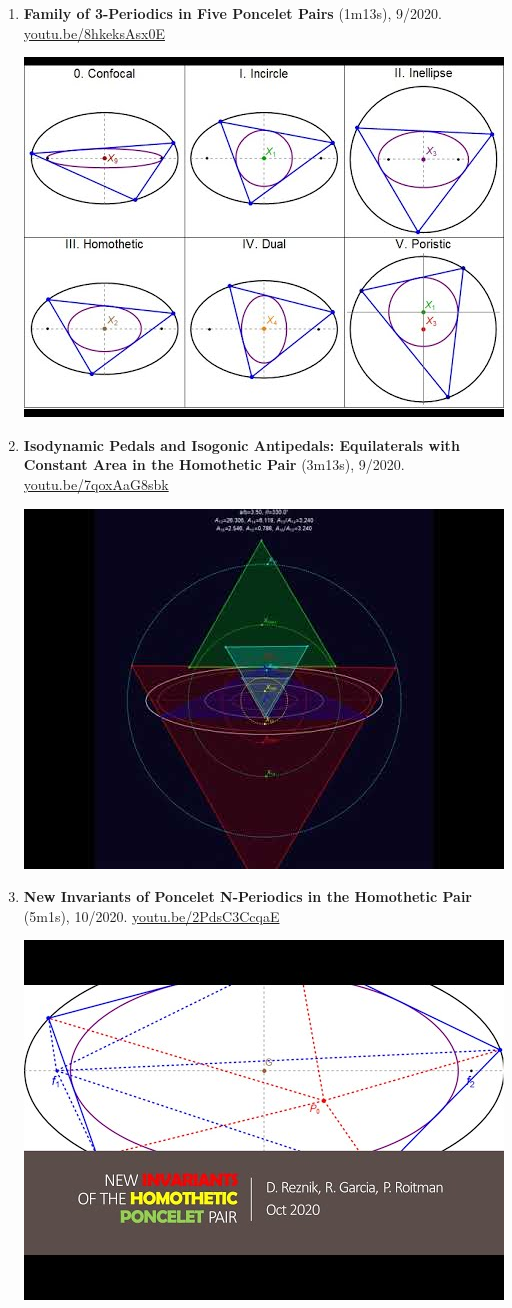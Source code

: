 \documentclass[12pt]{article}
\begin{document}
\begin{enumerate}[resume]
% 
\item \textbf{Family of 3-Periodics in Five Poncelet Pairs} (1m13s), 9/2020. \href{https://youtu.be/8hkeksAsx0E}{\url{youtu.be/8hkeksAsx0E}}
\begin{center}\includegraphics[width=.5\textwidth]{pics/8hkeksAsx0E.jpg}\end{center}
% 
\item \textbf{Isodynamic Pedals and Isogonic Antipedals: Equilaterals with Constant Area in the Homothetic Pair} (3m13s), 9/2020. \href{https://youtu.be/7qoxAaG8sbk}{\url{youtu.be/7qoxAaG8sbk}}
\begin{center}\includegraphics[width=.5\textwidth]{pics/7qoxAaG8sbk.jpg}\end{center}
% 
\item \textbf{New Invariants of Poncelet N-Periodics in the Homothetic Pair} (5m1s), 10/2020. \href{https://youtu.be/2PdsC3CcqaE}{\url{youtu.be/2PdsC3CcqaE}}
\begin{center}\includegraphics[width=.5\textwidth]{pics/2PdsC3CcqaE.jpg}\end{center}

\end{enumerate}
\end{document}
